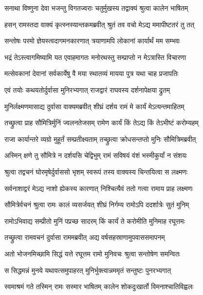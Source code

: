 \twolineshloka
{सनाथा विष्णुना देवा भजन्तु विगतज्वराः}
{चतुर्मुखस्य तद्वाक्यं श्रुत्वा कालेन भाषितम्} %

\twolineshloka
{हसन् रामस्तदा वाक्यं कृत्स्नस्यान्तकमब्रवीत्}
{श्रुतं तव वचो मेऽद्य ममापीष्टतरं तु तत्} %

\twolineshloka
{सन्तोषः परमो ज्ञेयस्त्वदागमनकारणात्}
{त्रयाणामपि लोकानां कार्यार्थं मम सम्भवः} %

\twolineshloka
{भद्रं तेऽस्त्वागमिष्यामि यत एवाहमागतः}
{मनोरथस्तु सम्प्राप्तो न मेऽत्रास्ति विचारणा} %

\twolineshloka
{मत्सेवकानां देवानां सर्वकार्येषु वै मया}
{स्थातव्यं मायया पुत्र यथा चाह प्रजापतिः} %

\twolineshloka
{एवं तयोः कथयतोर्दुर्वासा मुनिरभ्यगात्}
{राजद्वारं राघवस्य दर्शनापेक्षया द्रुतम्} %

\twolineshloka
{मुनिर्लक्ष्मणमासाद्य दुर्वासा वाक्यमब्रवीत्}
{शीघ्रं दर्शय रामं मे कार्यं मेऽत्यन्तमाहितम्} %

\twolineshloka
{तच्छ्रुत्वा प्राह सौमित्रिर्मुनिं ज्वलनतेजसम्}
{रामेण कार्यं किं तेऽद्य किं तेऽभीष्टं करोम्यहम्} %

\twolineshloka
{राजा कार्यान्तरे व्यग्रो मुहूर्तं सम्प्रतीक्ष्यताम्}
{तच्छ्रुत्वा क्रोधसन्तप्तो मुनिः सौमित्रिमब्रवीत्} %

\twolineshloka
{अस्मिन् क्षणे तु सौमित्रे न दर्शयसि चेद्विभुम्}
{रामं सविषयं वंशं भस्मीकुर्यां न संशयः} %

\twolineshloka
{श्रुत्वा तद्वचनं घोरमृषेर्दुर्वाससो भृशम्}
{स्वरूपं तस्य वाक्यस्य चिन्तयित्वा स लक्ष्मणः} %

\twolineshloka
{सर्वनाशाद्वरं मेऽद्य नाशो ह्येकस्य कारणात्}
{निश्चित्यैवं ततो गत्वा रामाय प्राह लक्ष्मणः} %

\twolineshloka
{सौमित्रेर्वचनं श्रुत्वा रामः कालं व्यसर्जयत्}
{शीघ्रं निर्गम्य रामोऽपि ददर्शात्रेः सुतं मुनिम्} %

\twolineshloka
{रामोऽभिवाद्य सम्प्रीतो मुनिं पप्रच्छ सादरम्}
{किं कार्यं ते करोमीति मुनिमाह रघूत्तमः} %

\twolineshloka
{तच्छ्रुत्वा रामवचनं दुर्वासा राममब्रवीत्}
{अद्य वर्षसहस्राणामुपवाससमापनम्} %

\twolineshloka
{अतो भोजनमिच्छामि सिद्धं यत्ते रघूत्तम}
{रामो मुनिवचः श्रुत्वा सन्तोषेण समन्वितः} %

\twolineshloka
{स सिद्धमन्नं मुनये यथावत्समुपाहरत्}
{मुनिर्भुक्त्वान्नममृतं सन्तुष्टः पुनरभ्यगात्} %

\twolineshloka
{स्वमाश्रमं गते तस्मिन् रामः सस्मार भाषितम्}
{कालेन शोकदुःखार्तो विमनाश्चातिविह्वलः} %

